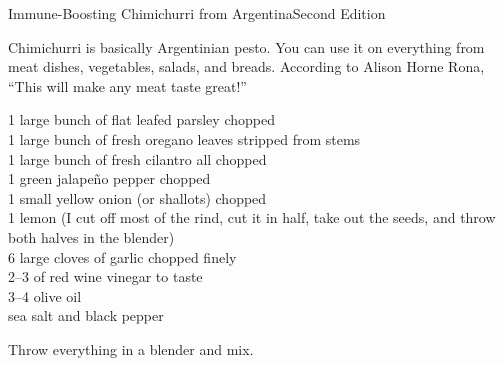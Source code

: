 \begin{entry}{Immune-Boosting Chimichurri from Argentina}{Second Edition}

\begin{open}
    Chimichurri is basically Argentinian pesto.  You can use it on everything
    from meat dishes, vegetables, salads, and breads.  According to Alison Horne Rona, ``This will make any meat taste great!''
\end{open}
\begin{ingredients}
    1 large bunch of flat leafed parsley chopped\\
    1 large bunch of fresh oregano leaves stripped from stems\\
    1 large bunch of fresh cilantro all chopped\\
    1 green jalape\~{n}o pepper chopped\\
    1 small yellow onion (or shallots) chopped\\
    1 lemon (I cut off most of the rind, cut it in half, take out the seeds, and
    throw both halves in the blender)\\
    6 large cloves of garlic chopped finely\\
    \SIrange{2}{3}{\tblspoon} of red wine vinegar to taste\\
    \SIrange{3}{4}{\tblspoon} olive oil\\
    sea salt and black pepper
\end{ingredients}
Throw everything in a blender and mix.
\end{entry}


